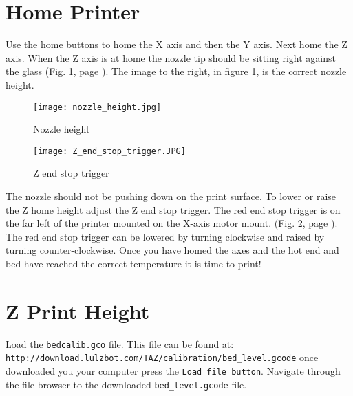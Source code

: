 \section{Home Printer}
Use the home buttons to home the X axis and then the Y axis. Next home the Z axis. When the Z axis is at home the nozzle tip should be sitting right against the glass
(Fig. \ref{fig:nozzle_height}, page \pageref{fig:nozzle_height}). The image to the right, in figure \ref{fig:nozzle_height}, is the correct nozzle height.
\begin{figure}[p]
\centering
\texttt{[image: nozzle\_height.jpg]}
\caption{Nozzle height}
\label{fig:nozzle_height}
\end{figure}
\begin{figure}[p]
\centering
\texttt{[image: Z\_end\_stop\_trigger.JPG]}
\caption{Z end stop trigger}
\label{fig:Z_end_stop_trigger}
\end{figure}
The nozzle should not be pushing down on the print surface. To lower or raise the Z home height adjust the Z end stop trigger. The red end stop trigger is on the far left of the printer mounted on the X-axis motor mount.
(Fig. \ref{fig:Z_end_stop_trigger}, page \pageref{fig:Z_end_stop_trigger}).
The red end stop trigger can be lowered by turning clockwise and raised by turning counter-clockwise. Once you have homed the axes and the hot end and bed have reached the correct temperature it is time to print!

\section{Z Print Height}
Load the \texttt{bedcalib.gco} file.
This file can be found at:
\texttt{http://download.lulzbot.com/TAZ/calibration/bed_level.gcode} once downloaded you your computer press the \texttt{Load file button}. Navigate through the file browser to the downloaded \texttt{bed_level.gcode} file.

